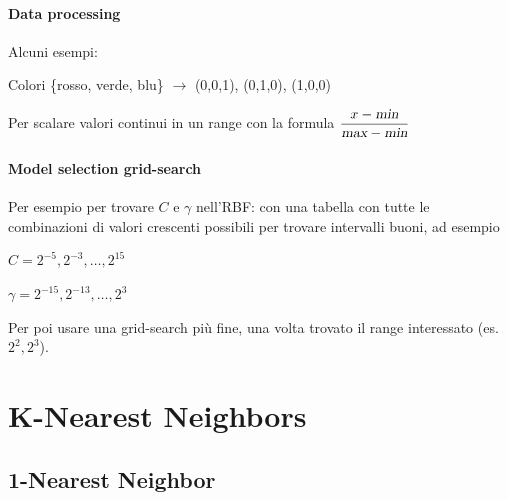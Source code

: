 \documentclass[10pt]{book}
\begin{document}
\paragraph{Data processing} Alcuni esempi:
\begin{list}{}{}
	\item Colori \{rosso, verde, blu\} $\rightarrow$ (0,0,1), (0,1,0), (1,0,0)
	\item Per scalare valori continui in un range con la formula $\mathlarger{\frac{x - \textsl{min}}{\textsl{max} - \textsl{min}}}$
\end{list}
\paragraph{Model selection grid-search} Per esempio per trovare $C$ e $\gamma$ nell'RBF: con una tabella con tutte le combinazioni di valori crescenti possibili per trovare intervalli buoni, ad esempio
\begin{list}{}{}
	\item $C = 2^{-5}, 2^{-3},\ldots,2^{15}$
	\item $\gamma = 2^{-15}, 2^{-13},\ldots,2^3$
\end{list}
Per poi usare una grid-search più fine, una volta trovato il range interessato (es. $2^2, 2^3$).
\section{K-Nearest Neighbors}
\subsection{1-Nearest Neighbor}
\end{document}
